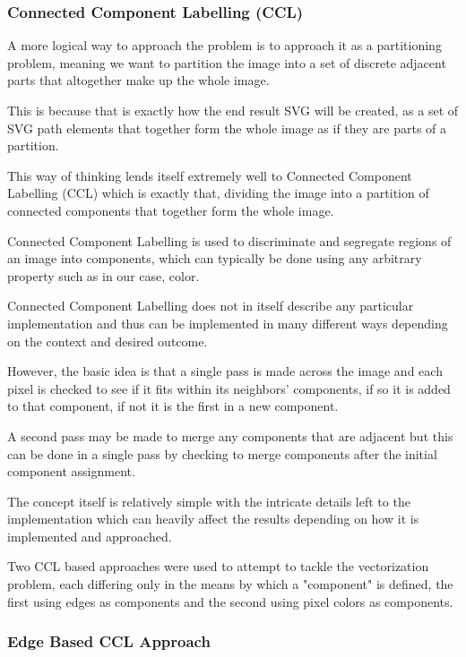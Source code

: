 \documentclass[12pt]{article}
\newcommand{\sentence}{} %
\begin{document}
    \subsubsection{Connected Component Labelling (CCL)}\label{subsubsec:connected-component-labelling-(ccl)}

    \tab
    A more logical way to approach the problem is to approach it as a partitioning problem, meaning we want to
    partition the image into a set of discrete adjacent parts that altogether make up the whole image.
    \sentence
    This is because that is exactly how the end result SVG will be created, as a set of SVG path elements that together
    form the whole image as if they are parts of a partition.
    \sentence
    This way of thinking lends itself extremely well to Connected Component Labelling (CCL) which is exactly that,
    dividing the image into a partition of connected components that together form the whole image.
    \sentence
    Connected Component Labelling is used to discriminate and segregate regions of an image into components, which
    can typically be done using any arbitrary property such as in our case, color.
    \sentence
    Connected Component Labelling does not in itself describe any particular implementation and thus can be
    implemented in many different ways depending on the context and desired outcome.
    \sentence
    However, the basic idea is that a single pass is made across the image and each pixel is checked to see if it
    fits within its neighbors' components, if so it is added to that component, if not it is the first in a new
    component.
    \sentence
    A second pass may be made to merge any components that are adjacent but this can be done in a single pass
    by checking to merge components after the initial component assignment.
    \sentence
    The concept itself is relatively simple with the intricate details left to the implementation which can heavily
    affect the results depending on how it is implemented and approached.
    \sentence
    Two CCL based approaches were used to attempt to tackle the vectorization problem, each differing only in the
    means by which a "component" is defined, the first using edges as components and the second using pixel colors as
    components.

    \subsubsection{Edge Based CCL Approach}\label{subsubsec:edge-based-ccl-approach}
\end{document}

